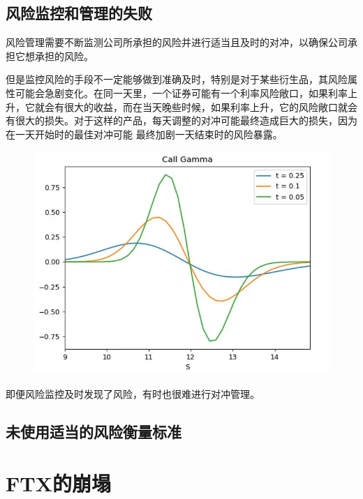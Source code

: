 \subsection*{风险监控和管理的失败}
风险管理需要不断监测公司所承担的风险并进行适当且及时的对冲，以确保公司承担它想承担的风险。

但是监控风险的手段不一定能够做到准确及时，特别是对于某些衍生品，其风险属性可能会急剧变化。在同一天里，一个证券可能有一个利率风险敞口，如果利率上升，它就会有很大的收益，而在当天晚些时候，如果利率上升，它的风险敞口就会有很大的损失。对于这样的产品，每天调整的对冲可能最终造成巨大的损失，因为在一天开始时的最佳对冲可能 最终加剧一天结束时的风险暴露。
\begin{figure}
    \includegraphics[width=\linewidth]{img/Exotic_Gamma.png}
\end{figure}

即便风险监控及时发现了风险，有时也很难进行对冲管理。

\subsection*{未使用适当的风险衡量标准}


\section*{FTX的崩塌}

